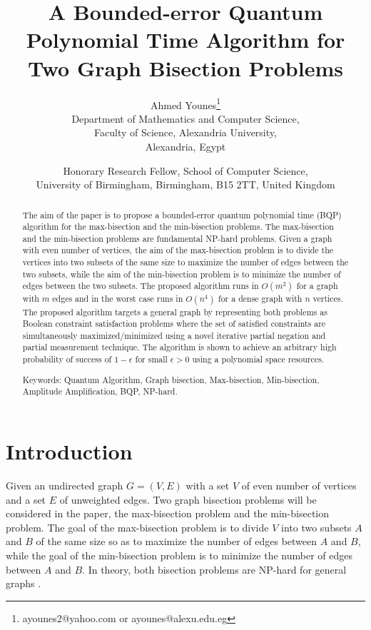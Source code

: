 \documentclass[a4paper]{article}
\title{A Bounded-error Quantum Polynomial Time Algorithm for Two Graph Bisection Problems}
\author{Ahmed Younes\footnote {ayounes2@yahoo.com or ayounes@alexu.edu.eg}\\
Department of Mathematics and Computer Science, \\Faculty of Science, Alexandria University, \\Alexandria, Egypt 
\and Honorary Research Fellow, School of Computer Science,\\ University of Birmingham, Birmingham, B15 2TT, United Kingdom}
\begin{document}
\maketitle

\begin{abstract}
The aim of the paper is to propose a bounded-error quantum polynomial time (BQP) algorithm for the max-bisection and 
the min-bisection problems. The max-bisection and the min-bisection problems are fundamental NP-hard problems. 
Given a graph with even number of vertices, the aim of the max-bisection problem is to divide 
the vertices into two subsets of the same size to maximize the number of edges between the two subsets, 
while the aim of the min-bisection problem is to minimize the number of edges between the two subsets. 
The proposed algorithm runs in $O(m^2)$ for a graph with $m$ edges and in the worst case runs in $O(n^4)$ for a dense 
graph with $n$ vertices. The proposed algorithm targets a general graph by representing both problems as Boolean 
constraint satisfaction problems where the set of satisfied constraints are simultaneously maximized/minimized 
using a novel iterative partial negation and partial measurement technique. 
The algorithm is shown to achieve an arbitrary high probability of success of 
$1-\epsilon$ for small $\epsilon>0$ using a polynomial space resources.  

  
%

\noindent
Keywords: Quantum Algorithm, Graph bisection, Max-bisection, Min-bisection, Amplitude Amplification, BQP, NP-hard.
\end{abstract}




\section{Introduction}  




Given an undirected graph $G = (V ,E)$ with a set $V$ of even number of vertices and a set $E$ of unweighted edges. 
Two graph bisection problems will be considered in the paper, the max-bisection problem and the min-bisection problem.
The goal of the max-bisection problem is to divide $V$ into two subsets $A$ and $B$ of the same size 
so as to maximize the number of edges between $A$ and $B$, while the goal of the min-bisection problem is to 
minimize the number of edges between $A$ and $B$. In theory, both bisection problems are NP-hard for general graphs \cite{Ref26,NPhard2007}.
\end{document}
